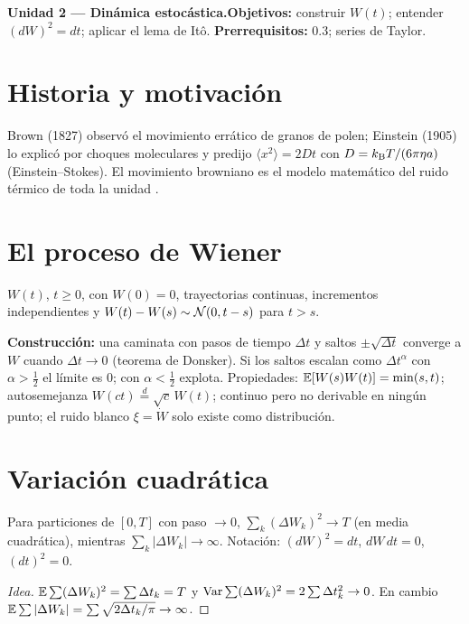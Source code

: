 \documentclass[11pt,a4paper]{article}
\begin{document}

\noindent\textbf{Unidad 2 --- Dinámica estocástica.}\quad\textbf{Objetivos:} construir $W(t)$; entender $(dW)^2=dt$;
aplicar el lema de Itô. \textbf{Prerrequisitos:} 0.3; series de Taylor.

\section{Historia y motivación}
Brown (1827) observó el movimiento errático de granos de polen; Einstein (1905) lo explicó por choques moleculares y
predijo $\langle x^2\rangle=2Dt$ con $D=k_{\mathrm B} T/(6\pi\eta a)$ (Einstein--Stokes). El movimiento browniano es el modelo
matemático del ruido térmico de toda la unidad \cite{gardiner}.

\section{El proceso de Wiener}
\begin{definicion}
$W(t)$, $t\ge0$, con $W(0)=0$, trayectorias continuas, incrementos independientes y $W(t)-W(s)\sim\mathcal{N}(0,t-s)$ para $t>s$.
\end{definicion}
\textbf{Construcción:} una caminata con pasos de tiempo $\Delta t$ y saltos $\pm\sqrt{\Delta t}$ converge a $W$ cuando
$\Delta t\to0$ (teorema de Donsker). Si los saltos escalan como $\Delta t^\alpha$ con $\alpha>\frac12$ el límite es 0;
con $\alpha<\frac12$ explota. Propiedades: $\mathbb{E}[W(s)W(t)]=\min(s,t)$; autosemejanza $W(ct)\overset{d}{=}\sqrt c\,W(t)$;
continuo pero no derivable en ningún punto; el ruido blanco $\xi=\dot W$ solo existe como distribución.

\section{Variación cuadrática}
\begin{resultado}
Para particiones de $[0,T]$ con paso $\to0$, $\sum_k(\Delta W_k)^2\to T$ (en media cuadrática), mientras
$\sum_k|\Delta W_k|\to\infty$. Notación: $(dW)^2=dt$, $dW\,dt=0$, $(dt)^2=0$.
\end{resultado}
\begin{proof}[Idea]
$\mathbb{E}\sum(\Delta W_k)^2=\sum\Delta t_k=T$ y $\operatorname{Var}\sum(\Delta W_k)^2=2\sum\Delta t_k^2\to0$. En cambio
$\mathbb{E}\sum|\Delta W_k|=\sum\sqrt{2\Delta t_k/\pi}\to\infty$.
\end{proof}
\end{document}
